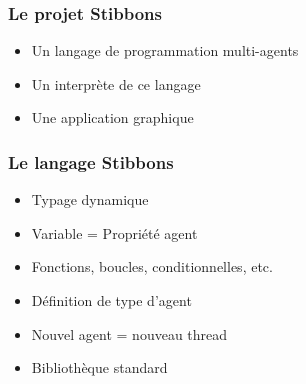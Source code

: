 \begin{frame}
\frametitle{Le projet Stibbons}
\begin{itemize}
	\item Un langage de programmation multi-agents
	\item Un interprète de ce langage
	\item Une application graphique
\end{itemize}
\end{frame}

\begin{frame}
\frametitle{Le langage Stibbons}
\begin{itemize}
        \item Typage dynamique
        \item Variable = Propriété agent
        \item Fonctions, boucles, conditionnelles, etc.
        \item Définition de type d'agent
        \item Nouvel agent = nouveau thread
        \item Bibliothèque standard
\end{itemize}
\end{frame}
